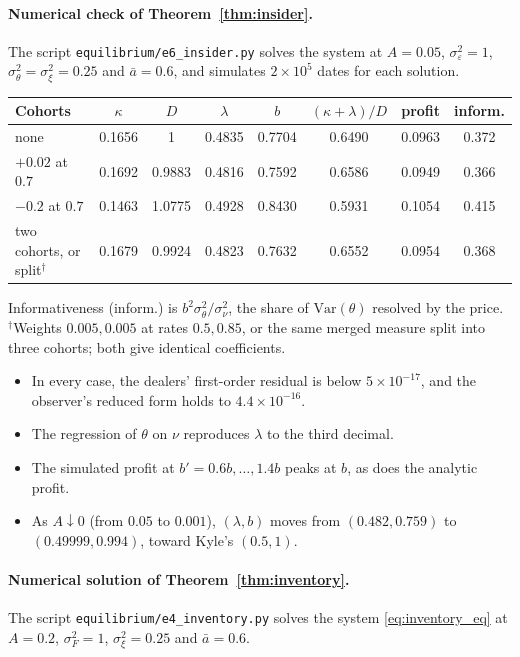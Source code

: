 \documentclass[12pt]{article}
\theoremstyle{definition}
\theoremstyle{remark}
\begin{document}
\paragraph{Numerical check of Theorem~\ref{thm:insider}.} The script \nolinkurl{equilibrium/e6_insider.py} solves the system at $A=0.05$, $\sigma_\varepsilon^2=1$, $\sigma_\theta^2=\sigma_\xi^2=0.25$ and $\bar a=0.6$, and simulates $2\times10^5$ dates for each solution.
\begin{center}\footnotesize\setlength{\tabcolsep}{3pt}
\begin{tabular}{lccccccc}
\hline
Cohorts & $\kappa$ & $D$ & $\lambda$ & $b$ & $(\kappa+\lambda)/D$ & profit & inform.\\
\hline
none & 0.1656 & 1 & 0.4835 & 0.7704 & 0.6490 & 0.0963 & 0.372\\
$+0.02$ at $0.7$ & 0.1692 & 0.9883 & 0.4816 & 0.7592 & 0.6586 & 0.0949 & 0.366\\
$-0.2$ at $0.7$ & 0.1463 & 1.0775 & 0.4928 & 0.8430 & 0.5931 & 0.1054 & 0.415\\
two cohorts, or split$^\dagger$ & 0.1679 & 0.9924 & 0.4823 & 0.7632 & 0.6552 & 0.0954 & 0.368\\
\hline
\end{tabular}
\end{center}
Informativeness (inform.) is $b^2\sigma_\theta^2/\sigma_\nu^2$, the share of $\mathrm{Var}(\theta)$ resolved by the price. $^\dagger$Weights $0.005,0.005$ at rates $0.5,0.85$, or the same merged measure split into three cohorts; both give identical coefficients.
\begin{itemize}[itemsep=1pt,topsep=2pt]
\item In every case, the dealers' first-order residual is below $5\times10^{-17}$, and the observer's reduced form holds to $4.4\times10^{-16}$.
\item The regression of $\theta$ on $\nu$ reproduces $\lambda$ to the third decimal.
\item The simulated profit at $b'=0.6b,\ldots,1.4b$ peaks at $b$, as does the analytic profit.
\item As $A\downarrow0$ (from $0.05$ to $0.001$), $(\lambda,b)$ moves from $(0.482,0.759)$ to $(0.49999,0.994)$, toward Kyle's $(0.5,1)$.
\end{itemize}

\paragraph{Numerical solution of Theorem~\ref{thm:inventory}.} The script \nolinkurl{equilibrium/e4_inventory.py} solves the system \eqref{eq:inventory_eq} at $A=0.2$, $\sigma_F^2=1$, $\sigma_\xi^2=0.25$ and $\bar a=0.6$.
\end{document}
